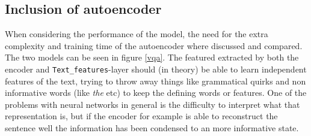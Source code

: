 \documentclass[10pt,a4paper]{report}
\begin{document}
	\subsection*{Inclusion of autoencoder}
	When considering the performance of the model, the need for the extra complexity and training time of the autoencoder where discussed and compared. The two models can be seen in figure \ref{vqa}. The featured extracted by both the encoder and \texttt{Text\_features}-layer should (in theory) be able to learn independent features of the text, trying to throw away things like grammatical quirks and non informative words (like \textit{the} etc) to keep the defining words or features. One of the problems with neural networks in general is the difficulty to interpret what that representation is, but if the encoder for example is able to reconstruct the sentence well the information has been condensed to an more informative state.
\end{document}
